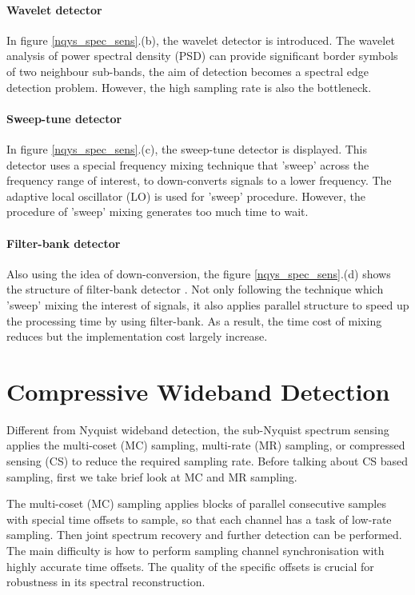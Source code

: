 \paragraph{Wavelet detector}
In figure \ref{nqys_spec_sens}.(b), the wavelet detector\cite{tian2006wavelet} is introduced. The wavelet analysis of power spectral density (PSD) can provide significant border symbols of two neighbour sub-bands, the aim of detection becomes a spectral edge detection problem. However, the high sampling rate is also the bottleneck.

\paragraph{Sweep-tune detector}
In figure \ref{nqys_spec_sens}.(c), the sweep-tune detector\cite{quan2009optimal, farhang2008filter} is displayed. This detector uses a special frequency mixing technique that 'sweep' across the frequency range of interest, to down-converts signals to a lower frequency. The adaptive local oscillator (LO) is used for 'sweep' procedure. However, the procedure of 'sweep' mixing generates too much time to wait.

\paragraph{Filter-bank detector}
Also using the idea of down-conversion, the figure \ref{nqys_spec_sens}.(d) shows the structure of filter-bank detector \cite{farhang2008filter}. Not only following the technique which 'sweep' mixing the interest of signals, it also applies parallel structure to speed up the processing time by using filter-bank. As a result, the time cost of mixing reduces but the implementation cost largely increase.

\section{Compressive Wideband Detection}\label{sct:cwd}

\indent	\indent Different from Nyquist wideband detection, the sub-Nyquist spectrum sensing applies the multi-coset (MC) sampling, multi-rate (MR) sampling, or compressed sensing (CS) to reduce the required sampling rate. Before talking about CS based sampling, first we take brief look at MC and MR sampling.

The multi-coset (MC) sampling \cite{venkataramani2000perfect} applies blocks of parallel consecutive samples with special time offsets to sample, so that each channel has a task of low-rate sampling. Then joint spectrum recovery and further detection can be performed. The main difficulty is how to perform sampling channel synchronisation with highly accurate time offsets. The quality of the specific offsets is crucial for robustness in its spectral reconstruction.

